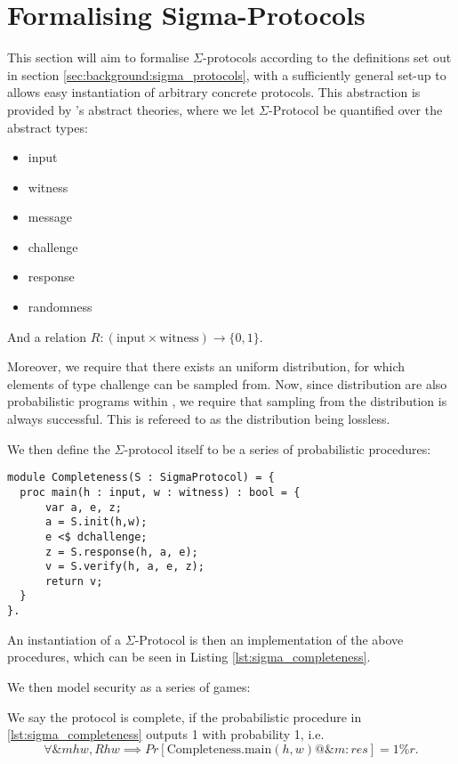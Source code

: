 \chapter{Formalising Sigma-Protocols}
\label{ch:formal_sigma}
This section will aim to formalise $\Sigma$-protocols according to the
definitions set out in section \ref{sec:background:sigma_protocols}, with a
sufficiently general set-up to allows easy instantiation of arbitrary concrete
protocols.
This abstraction is provided by \easycrypt's abstract theories, where we let
$\Sigma$-Protocol be quantified over the abstract types:
\begin{itemize}
  \item input
  \item witness
  \item message
  \item challenge
  \item response
  \item randomness
\end{itemize}

And a relation $R : (\text{input} \times \text{witness}) \rightarrow \{0,1\}$.

Moreover, we require that there exists an uniform distribution, for which
elements of type challenge can be sampled from. Now, since distribution are also
probabilistic programs within \easycrypt, we require that sampling from the
distribution is always successful. This is refereed to as the distribution being lossless.

We then define the $\Sigma$-protocol itself to be a series of probabilistic procedures:



\begin{lstlisting}[float, label=lst:sigma_completeness,caption=Completeness game for $\Sigma$-Protocols]
module Completeness(S : SigmaProtocol) = {
  proc main(h : input, w : witness) : bool = {
      var a, e, z;
      a = S.init(h,w);
      e <$ dchallenge;
      z = S.response(h, a, e);
      v = S.verify(h, a, e, z);
      return v;
  }
}.
\end{lstlisting}

An instantiation of a $\Sigma$-Protocol is then an implementation of the above
procedures, which can be seen in Listing \ref{lst:sigma_completeness}.

We then model security as a series of games:

\begin{definition}[Completeness]
\label{def:sigma:completeness}
  We say the protocol is complete, if the probabilistic procedure in
  \ref{lst:sigma_completeness} outputs 1 with probability 1, i.e.
  \begin{equation}
    \label{eq:sigma_completeness}
    \forall \&m h w, R h w \implies Pr[\text{Completeness.main}(h,w) @ \&m : res] = 1\%r.
  \end{equation}
\end{definition}

